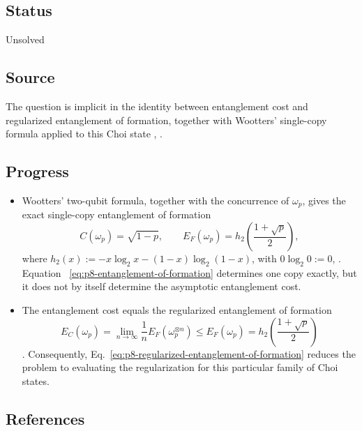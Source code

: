 \subsection*{Status}

Unsolved

\subsection*{Source}

The question is implicit in the identity between entanglement cost and
regularized entanglement of formation, together with Wootters' single-copy
formula applied to this Choi state
,
.

\subsection*{Progress}

\begin{itemize}
  \item Wootters' two-qubit formula, together with the concurrence of
  $\omega_p$, gives the exact single-copy entanglement of formation
  \begin{equation}
    C(\omega_p)=\sqrt{1-p},
    \qquad
    E_F(\omega_p)=h_2\!\left(\frac{1+\sqrt p}{2}\right),
    \label{eq:p8-entanglement-of-formation}
  \end{equation}
  where $h_2(x):=-x\log_2x-(1-x)\log_2(1-x)$, with $0\log_2 0:=0$,
  .  Equation~
  \eqref{eq:p8-entanglement-of-formation} determines one copy exactly, but it
  does not by itself determine the asymptotic entanglement cost.

  \item The entanglement cost equals the regularized entanglement of formation
  \begin{equation}
    E_C(\omega_p)
      =\lim_{n\to\infty}\frac1n E_F(\omega_p^{\otimes n})
      \le E_F(\omega_p)
      =h_2\!\left(\frac{1+\sqrt p}{2}\right)
    \label{eq:p8-regularized-entanglement-of-formation}
  \end{equation}
  .  Consequently,
  Eq.~\eqref{eq:p8-regularized-entanglement-of-formation} reduces the problem
  to evaluating the regularization for this particular family of Choi
  states.
\end{itemize}

\subsection*{References}

